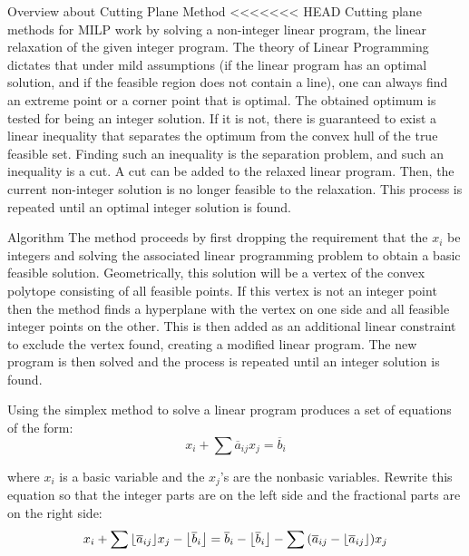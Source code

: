 \documentclass[9pt]{extarticle}
\DeclarePairedDelimiter\floor{\lfloor}{\rfloor}
\begin{document}
    \begin{section}{Overview about Cutting Plane Method}
<<<<<<< HEAD
        Cutting plane methods for MILP work by solving a non-integer linear program, the linear relaxation of the given integer 
        program. 
        The theory of Linear Programming dictates that under mild assumptions (if the linear program has an optimal solution, 
        and if the feasible region does not contain a line), one can always find an extreme point or a corner point that is 
        optimal. 
        The obtained optimum is tested for being an integer solution. 
        If it is not, there is guaranteed to exist a linear inequality that separates the optimum from the convex hull of the 
        true feasible set. 
        Finding such an inequality is the separation problem, and such an inequality is a cut. 
        A cut can be added to the relaxed linear program. Then, the current non-integer solution is no longer feasible to the 
        relaxation. 
        This process is repeated until an optimal integer solution is found. \cite{wiki:cuttingplane}
        
        \begin{subsection}{Algorithm}
            The method proceeds by first dropping the requirement that the $x_i$ be integers and solving the associated linear 
            programming problem to obtain a basic feasible solution. 
            Geometrically, this solution will be a vertex of the convex polytope consisting of all feasible points. 
            If this vertex is not an integer point then the method finds a hyperplane with the vertex on one side and all 
            feasible integer points on the other. 
            This is then added as an additional linear constraint to exclude the vertex found, creating a modified linear 
            program. 
            The new program is then solved and the process is repeated until an integer solution is found.
            \cite{wiki:cuttingplane}

            Using the simplex method to solve a linear program produces a set of equations of the form:
            \begin{equation*}
                x_i + \sum{\overline{a}_{ij}x_j} = \overline{b}_i
            \end{equation*}

            where $x_i$ is a basic variable and the $x_j$'s are the nonbasic variables. 
            Rewrite this equation so that the integer parts are on the left side and the fractional parts are on the right side:
            \begin{equation*}
                x_i + \sum{
                    \floor*{
                        \overline{a}_{ij}}
                    }x_j - \floor*{
                        \overline{b}_i
                     } = \overline{b}_i - \floor*{
                        \overline{b}_i
                     } - \sum{
                         (\overline{a}_{ij} - \floor*{
                            \overline{a}_{ij}
                        })x_j
                     }
            \end{equation*}


\end{subsection}
\end{section}
\end{document}
